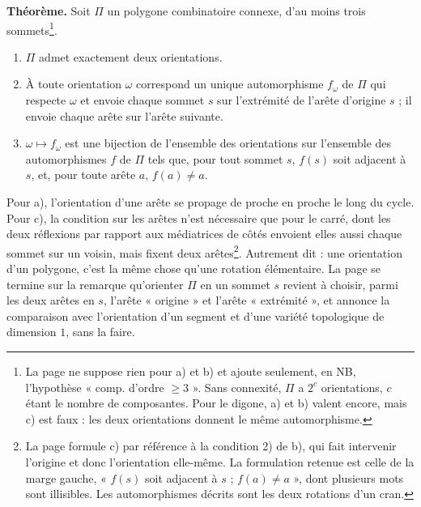 \documentclass[11pt,a4paper]{article}
\begin{document}
\textbf{Théorème.} Soit $\Pi$ un polygone combinatoire connexe, d'au moins trois
sommets\footnote{La page ne suppose rien pour a) et b) et ajoute seulement, en
NB, l'hypothèse « comp. d'ordre $\geqslant 3$ ». Sans connexité, $\Pi$ a
$2^{c}$ orientations, $c$ étant le nombre de composantes. Pour le digone, a) et
b) valent encore, mais c) est faux : les deux orientations donnent le même
automorphisme.}.
\begin{enumerate}
  \item[a)] $\Pi$ admet exactement deux orientations.
  \item[b)] À toute orientation $\omega$ correspond un unique automorphisme $f_\omega$
    de $\Pi$ qui respecte $\omega$ et envoie chaque sommet $s$ sur l'extrémité de
    l'arête d'origine $s$ ; il envoie chaque arête sur l'arête suivante.
  \item[c)] $\omega \mapsto f_\omega$ est une bijection de l'ensemble des orientations
    sur l'ensemble des automorphismes $f$ de $\Pi$ tels que, pour tout sommet $s$,
    $f(s)$ soit adjacent à $s$, et, pour toute arête $a$, $f(a) \neq a$.
\end{enumerate}
Pour a), l'orientation d'une arête se propage de proche en proche le long du
cycle. Pour c), la condition sur les arêtes n'est nécessaire que pour le carré,
dont les deux réflexions par rapport aux médiatrices de côtés envoient elles
aussi chaque sommet sur un voisin, mais fixent deux arêtes\footnote{La page
formule c) par référence à la condition 2) de b), qui fait intervenir l'origine
et donc l'orientation elle-même. La formulation retenue est celle de la marge
gauche, « $f(s)$ soit adjacent à $s$ ; $f(a) \neq a$ », dont plusieurs mots sont
illisibles. Les automorphismes décrits sont les deux rotations d'un cran.}.
Autrement dit : une orientation d'un polygone, c'est la même chose qu'une rotation
élémentaire. La page se termine sur la remarque qu'orienter $\Pi$ en un sommet $s$
revient à choisir, parmi les deux arêtes en $s$, l'arête « origine » et l'arête
« extrémité », et annonce la comparaison avec l'orientation d'un segment et d'une
variété topologique de dimension $1$, sans la faire.
\end{document}
